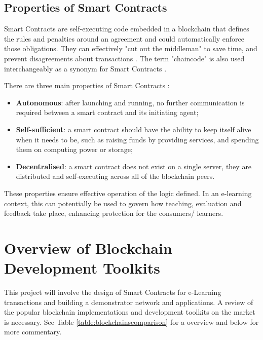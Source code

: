 \subsection{Properties of Smart Contracts}
Smart Contracts are self-executing code embedded in a blockchain that defines the rules and penalties around an agreement and
could automatically enforce those obligations. They can effectively "cut out the middleman" to save time, and prevent disagreements
about transactions \citep{gulhane2017ibm}. The term "chaincode" is also used interchangeably as a synonym for
Smart Contracts \citep[p.6]{valenta2017comparison}.

There are three main properties of Smart Contracts \citep[p.16]{swan2015blockchain}:

\begin{itemize}
	\setlength\itemsep{0em}
	\item \textbf{Autonomous}: after launching and running, no further communication is required between a smart contract
	      and its initiating agent;
	\item \textbf{Self-sufficient}: a smart contract should have the ability to keep itself alive when it needs to be,
	      such as raising funds by providing services, and spending them on computing power or storage;
	\item \textbf{Decentralised}: a smart contract does not exist on a single server, they are distributed and self-executing
	      across all of the blockchain peers.
\end{itemize}

These properties ensure effective operation of the logic defined. In an e-learning context, this can potentially
be used to govern how teaching, evaluation and feedback take place, enhancing protection for the consumers/ learners.

\section{Overview of Blockchain Development Toolkits}

This project will involve the design of Smart Contracts for e-Learning transactions and building a demonstrator
network and applications. A review of the popular blockchain implementations and development toolkits on the
market is necessary. See Table \ref{table:blockchainscomparison} for a overview and below for more commentary.

